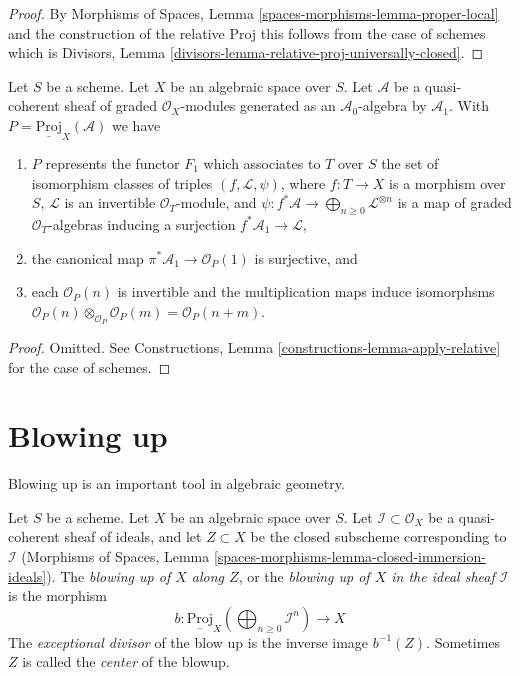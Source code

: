 \begin{proof}
By Morphisms of Spaces, Lemma
\ref{spaces-morphisms-lemma-proper-local}
and the construction of the relative Proj this follows from the
case of schemes which is
Divisors, Lemma \ref{divisors-lemma-relative-proj-universally-closed}.
\end{proof}

\begin{lemma}
\label{lemma-relative-proj-generated-in-degree-1}
Let $S$ be a scheme. Let $X$ be an algebraic space over $S$.
Let $\mathcal{A}$ be a quasi-coherent sheaf of graded $\mathcal{O}_X$-modules
generated as an $\mathcal{A}_0$-algebra by $\mathcal{A}_1$.
With $P = \underline{\text{Proj}}_X(\mathcal{A})$ we have
\begin{enumerate}
\item $P$ represents the functor $F_1$ which associates to
$T$ over $S$ the set of isomorphism classes of
triples $(f, \mathcal{L}, \psi)$, where $f : T \to X$ is a morphism
over $S$, $\mathcal{L}$ is an invertible $\mathcal{O}_T$-module, and
$\psi : f^*\mathcal{A} \to \bigoplus_{n \geq 0} \mathcal{L}^{\otimes n}$
is a map of graded $\mathcal{O}_T$-algebras inducing a surjection
$f^*\mathcal{A}_1 \to \mathcal{L}$,
\item the canonical map $\pi^*\mathcal{A}_1 \to \mathcal{O}_P(1)$ is
surjective, and
\item each $\mathcal{O}_P(n)$ is invertible
and the multiplication maps induce isomorphsms
$\mathcal{O}_P(n) \otimes_{\mathcal{O}_P} \mathcal{O}_P(m) =
\mathcal{O}_P(n + m)$.
\end{enumerate}
\end{lemma}

\begin{proof}
Omitted.
See Constructions, Lemma \ref{constructions-lemma-apply-relative}
for the case of schemes.
\end{proof}






\section{Blowing up}
\label{section-blowing-up}

\noindent
Blowing up is an important tool in algebraic geometry.

\begin{definition}
\label{definition-blow-up}
Let $S$ be a scheme. Let $X$ be an algebraic space over $S$.
Let $\mathcal{I} \subset \mathcal{O}_X$ be a quasi-coherent sheaf
of ideals, and let $Z \subset X$ be the closed subscheme corresponding
to $\mathcal{I}$
(Morphisms of Spaces, Lemma
\ref{spaces-morphisms-lemma-closed-immersion-ideals}).
The {\it blowing up of $X$ along $Z$}, or the
{\it blowing up of $X$ in the ideal sheaf $\mathcal{I}$} is
the morphism
$$
b :
\underline{\text{Proj}}_X
\left(\bigoplus\nolimits_{n \geq 0} \mathcal{I}^n\right)
\longrightarrow
X
$$
The {\it exceptional divisor} of the blow up is the inverse image
$b^{-1}(Z)$. Sometimes $Z$ is called the {\it center} of the blowup.
\end{definition}

